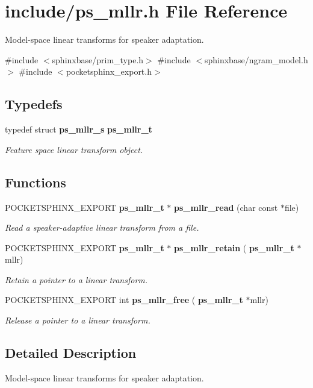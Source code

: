 \section{include/ps\+\_\+mllr.h File Reference}
\label{ps__mllr_8h}


Model-\/space linear transforms for speaker adaptation.  


{\ttfamily \#include $<$sphinxbase/prim\+\_\+type.\+h$>$}\newline
{\ttfamily \#include $<$sphinxbase/ngram\+\_\+model.\+h$>$}\newline
{\ttfamily \#include $<$pocketsphinx\+\_\+export.\+h$>$}\newline
\subsection*{Typedefs}
\begin{DoxyCompactItemize}
\item 
\mbox{\label{ps__mllr_8h_ad4b6bf4c3cb6a671f79f1d709857d5b1}} 
typedef struct \textbf{ ps\+\_\+mllr\+\_\+s} \textbf{ ps\+\_\+mllr\+\_\+t}
\begin{DoxyCompactList}\small\item\em Feature space linear transform object. \end{DoxyCompactList}\end{DoxyCompactItemize}
\subsection*{Functions}
\begin{DoxyCompactItemize}
\item 
\mbox{\label{ps__mllr_8h_a05d268b1d79a1be2ae96093c96aad79d}} 
P\+O\+C\+K\+E\+T\+S\+P\+H\+I\+N\+X\+\_\+\+E\+X\+P\+O\+RT \textbf{ ps\+\_\+mllr\+\_\+t} $\ast$ \textbf{ ps\+\_\+mllr\+\_\+read} (char const $\ast$file)
\begin{DoxyCompactList}\small\item\em Read a speaker-\/adaptive linear transform from a file. \end{DoxyCompactList}\item 
\mbox{\label{ps__mllr_8h_a2f40deff6976bf03a845aa474494edfb}} 
P\+O\+C\+K\+E\+T\+S\+P\+H\+I\+N\+X\+\_\+\+E\+X\+P\+O\+RT \textbf{ ps\+\_\+mllr\+\_\+t} $\ast$ \textbf{ ps\+\_\+mllr\+\_\+retain} (\textbf{ ps\+\_\+mllr\+\_\+t} $\ast$mllr)
\begin{DoxyCompactList}\small\item\em Retain a pointer to a linear transform. \end{DoxyCompactList}\item 
\mbox{\label{ps__mllr_8h_ae56a8c52dd7513b1883536f2a729e1d0}} 
P\+O\+C\+K\+E\+T\+S\+P\+H\+I\+N\+X\+\_\+\+E\+X\+P\+O\+RT int \textbf{ ps\+\_\+mllr\+\_\+free} (\textbf{ ps\+\_\+mllr\+\_\+t} $\ast$mllr)
\begin{DoxyCompactList}\small\item\em Release a pointer to a linear transform. \end{DoxyCompactList}\end{DoxyCompactItemize}


\subsection{Detailed Description}
Model-\/space linear transforms for speaker adaptation. 

